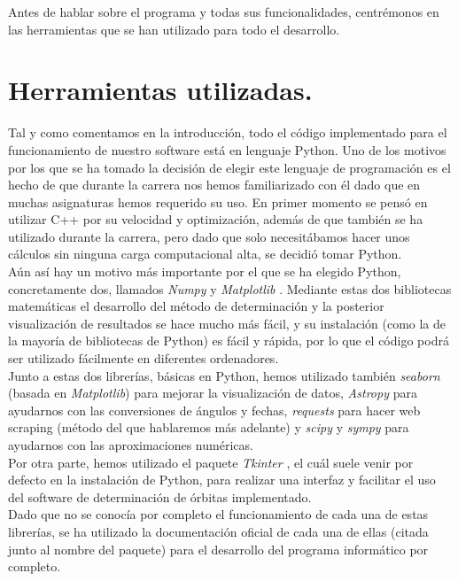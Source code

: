 \documentclass[11pt]{book}
\begin{document}
Antes de hablar sobre el programa y todas sus funcionalidades, centrémonos en las herramientas que se han utilizado para todo el desarrollo.\\

\section{Herramientas utilizadas.}
\label{sec:herramientas}
Tal y como comentamos en la introducción, todo el código implementado para el funcionamiento de nuestro software está en lenguaje Python. Uno de los motivos por los que se ha tomado la decisión de elegir este lenguaje de programación es el hecho de que durante la carrera nos hemos familiarizado con él dado que en muchas asignaturas hemos requerido su uso. En primer momento se pensó en utilizar C++ por su velocidad y optimización, además de que también se ha utilizado durante la carrera, pero dado que solo necesitábamos hacer unos cálculos sin ninguna carga computacional alta, se decidió tomar Python.\\

Aún así hay un motivo más importante por el que se ha elegido Python, concretamente dos, llamados \textit{Numpy} \cite{numpy} y \textit{Matplotlib} \cite{matplotlib}. Mediante estas dos bibliotecas matemáticas el desarrollo del método de determinación y la posterior visualización de resultados se hace mucho más fácil, y su instalación (como la de la mayoría de bibliotecas de Python) es fácil y rápida, por lo que el código podrá ser utilizado fácilmente en diferentes ordenadores.\\

Junto a estas dos librerías, básicas en Python, hemos utilizado también \textit{seaborn} \cite{seaborn} (basada en \textit{Matplotlib}) para mejorar la visualización de datos, \textit{Astropy} \cite{astropy} para ayudarnos con las conversiones de ángulos y fechas, \textit{requests} \cite{requests} para hacer web scraping (método del que hablaremos más adelante) y \textit{scipy} \cite{numpy} y \textit{sympy} \cite{sympy} para ayudarnos con las aproximaciones numéricas.\\

Por otra parte, hemos utilizado el paquete \textit{Tkinter} \cite{tkinter}, el cuál suele venir por defecto en la instalación de Python, para realizar una interfaz y facilitar el uso del software de determinación de órbitas implementado.\\

Dado que no se conocía por completo el funcionamiento de cada una de estas librerías, se ha utilizado la documentación oficial de cada una de ellas (citada junto al nombre del paquete) para el desarrollo del programa informático por completo.\\
\end{document}
